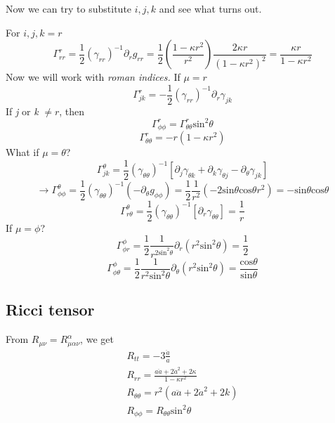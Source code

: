Now we can try to substitute $i,j,k$ and see what turns out.\par
For $i,j,k = r$
\[
\Gamma ^{r}_{rr} = \frac{1}{2} \left( \gamma _{rr} \right)^{-1} \partial_{r}g_{rr} = \frac{1}{2} \left( \frac{1-\kappa r^{2} }{r^{2}} \right) \frac{2\kappa r}{\left( 1-\kappa r^{2} \right)^{2}} = \frac{\kappa r}{1- \kappa r^{2}}
\]
Now we will work with \emph{roman indices.} If $\mu  = r$
\[
\Gamma ^{r}_{jk} = -\frac{1}{2}\left( \gamma _{rr} \right)^{-1}\partial_{r}\gamma_{jk}
\]
If \emph{j} or \emph{k} $\neq r$, then
\[
\Gamma ^{r}_{\phi \phi } = \Gamma ^{r}_{\theta \theta }\text{sin}^{2}\theta 
\]
\[
\Gamma ^{r}_{\theta \theta } = -r\left( 1-\kappa r^{2} \right)
\]
What if $\mu = \theta $?
\[
	\Gamma ^{\theta }_{jk} = \frac{1}{2}\left( \gamma _{\theta \theta } \right)^{-1}\left[ \partial_{j}\gamma _{\theta k} + \partial_{k}\gamma _{\theta j}- \partial_{\theta }\gamma _{jk} \right]
\]
\[
\to  \Gamma ^{\theta }_{\phi \phi } = \frac{1}{2} \left( \gamma _{\theta \theta } \right)^{-1} \left( -\partial_{\theta }g_{\phi \phi } \right) = \frac{1}{2}\frac{1}{r^{2}}\left( -2\text{sin}\theta \text{cos}\theta r^{2} \right) = -\text{sin}\theta \text{cos}\theta 
\]
\[
\Gamma ^{\theta }_{r \theta } = \frac{1}{2} \left( \gamma _{\theta \theta } \right)^{-1}\left[ \partial_{r}\gamma _{\theta \theta } \right] = \frac{1}{r}
\]
If $\mu  = \phi $?
\[
\Gamma ^{\phi }_{\phi r} = \frac{1}{2} \frac{1}{r^{2\text{sin}^{2}\theta }}\partial_{r}\left( r^{2}\text{sin}^{2}\theta  \right) = \frac{1}{2}
\]
\[
\Gamma ^{\phi }_{\phi \theta } = \frac{1}{2} \frac{1}{r^{2}\text{sin}^{2}\theta }\partial_{\theta }\left( r^{2}\text{sin}^{2}\theta  \right) = \frac{\text{cos}\theta }{\text{sin}\theta }
\]
\subsection{Ricci tensor}
From $R_{\mu \nu } = R^{\alpha }_{\mu \alpha \nu }$, we get
\begin{gather*}
R_{tt } = - 3 \frac{\ddot{a}}{a} \\
R_{rr} = \frac{a \ddot{a} + 2 \dot{a}^{2} +2\kappa }{1-\kappa r^{2}}\\
R_{\theta \theta } = r^{2} \left( a \ddot{a} + 2\dot{a}^{2}+2k \right)\\
R_{\phi \phi } = R_{\theta \theta }\text{sin}^{2}\theta 
\end{gather*}









